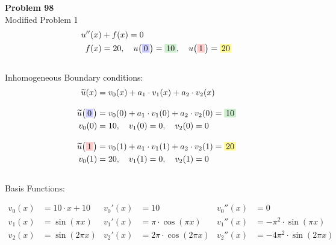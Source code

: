 \documentclass[
final,
a4paper,
oneside,
parskip=full,
headings=standardclasses,
headings=big,
pointednumbers,
fleqn
]{scrartcl}
\newcommand{\tfillb}[1]{\tfillc[#1][blue!20]}
\newcommand{\tfillg}[1]{\tfillc[#1][Green!20]}
\newcommand{\tfilly}[1]{\tfillc[#1][yellow!40]}
\newcommand{\tfillr}[1]{\tfillc[#1][red!20]}
\newcommand{\kl}[1]{{\left( #1 \right)}}
\begin{document}
    {\bf{Problem 98}} \\
    Modified Problem 1 \\
    {\setlength{\abovedisplayskip}{-12pt}
    \setlength{\belowdisplayskip}{-6pt}
    \begin{align*}
    u''\kl{x} &+ f\kl{x} = 0 \\
    f\kl{x} &= 20, \quad u\kl{\tfillb{$0$}} = \tfillg{$10$} , \quad u\kl{\tfillr{$1$}} = \tfilly{$20$}
    \end{align*}} \\
    Inhomogeneous Boundary conditions: \\
    {\setlength{\abovedisplayskip}{-12pt}
    \setlength{\belowdisplayskip}{-22pt}
    \begin{align*}
    \widetilde{u}\kl{x} & = v_0\kl{x} + a_1 \cdot v_1\kl{x} + a_2 \cdot v_2\kl{x} \\[0.3cm]
    \widetilde{u}\kl{\tfillb{$0$}} & = v_0\kl{0} + a_1 \cdot v_1\kl{0} + a_2 \cdot v_2\kl{0} = \tfillg{$10$}\\
    v_0\kl{0} &= 10, \quad v_1\kl{0} = 0, \quad v_2\kl{0} = 0\\[0.3cm]
    \widetilde{u}\kl{\tfillr{$1$}} & = v_0\kl{1} + a_1 \cdot v_1\kl{1} + a_2 \cdot v_2\kl{1} = \tfilly{$20$}\\
    v_0\kl{1} &= 20, \quad v_1\kl{1} = 0, \quad v_2\kl{1} = 0\\
    \end{align*}} \\
    Basis Functions: \\
    \begin{minipage}{0.6\textwidth}
        \setlength{\abovedisplayskip}{0pt}
        \setlength{\belowdisplayskip}{-12pt}
        \begin{align*}
        v_0\kl{x} &= 10 \cdot x + 10    &v_0'\kl{x} &= 10                            &v_0''\kl{x} &= 0 \\
        v_1\kl{x} &= \sin\kl{\pi x}     &v_1'\kl{x} &= \pi \cdot \cos\kl{\pi x}      &v_1''\kl{x} &= -\pi^2 \cdot \sin\kl{\pi x}\\
        v_2\kl{x} &= \sin\kl{2 \pi x}   &v_2'\kl{x} &= 2 \pi \cdot \cos\kl{2 \pi x}  &v_2''\kl{x} &= -4 \pi^2 \cdot \sin\kl{2 \pi x}
        \end{align*}
    \end{minipage}
\end{document}
